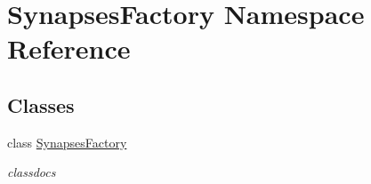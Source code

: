 \hypertarget{namespace_synapses_factory}{\section{Synapses\-Factory Namespace Reference}
\label{namespace_synapses_factory}
}
\subsection*{Classes}
\begin{DoxyCompactItemize}
\item 
class \hyperlink{class_synapses_factory_1_1_synapses_factory}{Synapses\-Factory}
\begin{DoxyCompactList}\small\item\em classdocs \end{DoxyCompactList}\end{DoxyCompactItemize}
